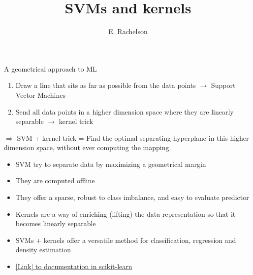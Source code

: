 \documentclass{beamer}
\title{SVMs and kernels}
\author{E. Rachelson}
\begin{document}
\begin{frame}{A geometrical approach to ML}
\begin{block}{}
\begin{enumerate}
\item Draw a line that sits as far as possible from the data points $\rightarrow$ Support Vector Machines
\item Send all data points in a higher dimension space where they are linearly separable $\rightarrow$ kernel trick
\end{enumerate}
$\Rightarrow$ SVM + kernel trick = Find the optimal separating hyperplane in this higher dimension space, without ever computing the mapping.
\end{block}

\begin{itemize}
\item SVM try to separate data by maximizing a geometrical margin
\item They are computed offline
\item They offer a sparse, robust to class imbalance, and easy to evaluate predictor
\item Kernels are a way of enriching (lifting) the data representation so that it becomes linearly separable
\item SVMs + kernels offer a versatile method for classification, regression and density estimation
\item \href{http://scikit-learn.org/stable/modules/svm.html}{[Link] to documentation in scikit-learn}
\end{itemize}
\end{frame}
\end{document}
